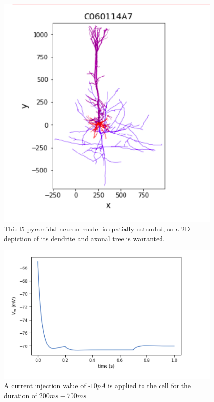 \centering
\begin{figure}%
  \centering
    \includegraphics[scale=0.8]{figures/morphology_view.png}
    \caption[l5 pyramidal neuron tree]{This l5 pyramidal neuron model is spatially extended, so a 2D depiction of its dendrite and axonal tree is warranted.}
  \label{fig:brief_shape}
\end{figure}
\begin{center}

\begin{figure}%
  \centering
    \includegraphics[scale=0.8]{figures/correct_passive_l5pc.png}
    \caption[plot of negative amplitude current stimulus]{A current injection value of -$10pA$ is applied to the cell for the duration of $200ms-700ms$}
  \label{fig:passive_properties}
\end{figure}
\end{center}



